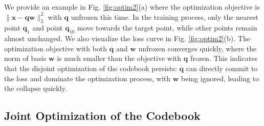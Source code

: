 We provide an example in Fig. \ref{fig:optim2}(a) where the optimization objective is $\|\bm{x}-\bm{q}\bm{w}\|^2_2$ with $\bm{q}$ unfrozen this time. In the training process, only the nearest point $\bm{q}_1$ and point $\bm{q}_{10}$ move towards the target point, while other points remain almost unchanged. We also visualize the loss curve in Fig. \ref{fig:optim2}(b). The optimization objective with both $\bm{q}$ and $\bm{w}$ unfrozen converges quickly, where the norm of basis $\bm{w}$ is much smaller than the objective with $\bm{q}$ frozen. This indicates that the disjoint optimization of the codebook persists: $\bm{q}$ can directly commit to the loss and dominate the optimization process, with $\bm{w}$ being ignored, leading to the collapse quickly.



\subsection{Joint Optimization of the Codebook}




